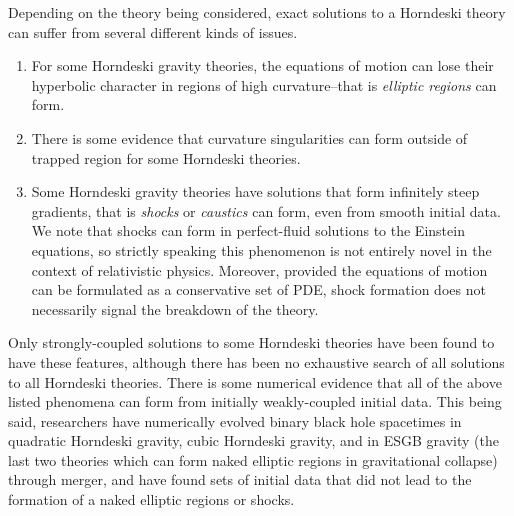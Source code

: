 \documentclass{ws-ijmpd}
\begin{document}
Depending on the theory being considered,
exact solutions to a Horndeski theory can suffer
from several different kinds of issues.
\begin{enumerate}
   \item For some Horndeski gravity theories,
      the equations of motion can lose their hyperbolic character
      in regions of high curvature--that is
      \emph{elliptic regions}\cite{Ripley:2019hxt,
         Ripley:2019irj,Figueras:2020dzx} can form.
   
      \item There is some evidence that
      curvature singularities can form outside of trapped region for
      some Horndeski theories\cite{Kanti:1995vq,Sotiriou:2014pfa,
      Silva:2017uqg,Doneva:2017bvd,Antoniou:2017hxj,Kleihaus:2015aje}.
   
   \item Some Horndeski gravity theories have solutions that
      form infinitely steep gradients, that is
      \emph{shocks} or 
      \emph{caustics}\cite{Babichev:2016hys,
         deRham:2016ged, 
         Tanahashi:2017kgn,
         Pasmatsiou:2017vcw,
         Babichev:2017lrx,
         Lara:2021piy
      } can form, even from smooth initial data. 
      We note that shocks can form in perfect-fluid solutions
      to the Einstein equations, so strictly speaking this phenomenon
      is not entirely novel in the context of relativistic physics.
      Moreover, provided the equations of motion can be formulated
      as a conservative set of PDE, shock formation does not necessarily 
      signal the breakdown of the theory.

\end{enumerate}
Only strongly-coupled solutions to some Horndeski theories
have been found to have these features,
although there has been no exhaustive search of all solutions
to all Horndeski theories.
There is some numerical evidence that all of the above listed
phenomena can form from initially weakly-coupled initial data.
This being said,
researchers have numerically evolved binary black hole spacetimes
in quadratic Horndeski gravity, cubic Horndeski gravity,
and in ESGB gravity (the last two theories
which can form naked elliptic regions in 
gravitational collapse\cite{Ripley:2019hxt,
Ripley:2019irj,Bernard:2019fjb,Figueras:2020dzx,Lara:2021piy}) 
through merger, and have found sets of initial data that did not lead to
the formation of a naked elliptic regions or 
shocks\cite{East:2020hgw,East:2021bqk,Figueras:2021abd}.
\end{document}
